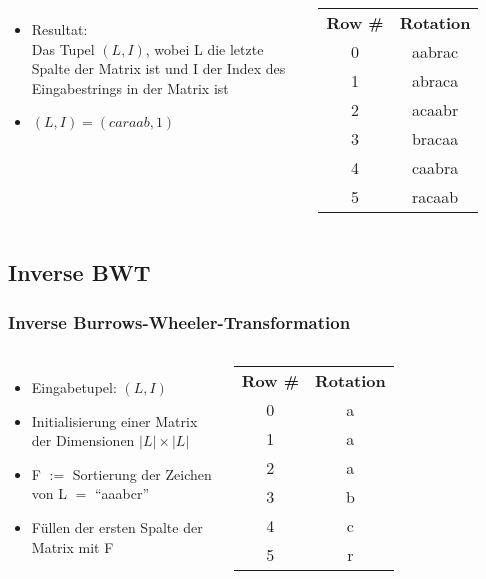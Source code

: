 \documentclass[14pt,xcolor=dvipsnames]{beamer}
\begin{document}
\begin{frame}[allowframebreaks]
\begin{columns}[c,onlytextwidth]
 \begin{itemize}
  \item Resultat:\\
      Das Tupel \textit{$(L,I)$}, wobei L die {\color{red}letzte Spalte} der Matrix ist
      und I der Index des {\color{darkgreen}Eingabestrings in der Matrix} ist
  \item $(L,I) = (caraab, 1)$
 \end{itemize}
    \begin{tabular}{c|c}
    \textbf{Row \#} & \textbf{Rotation} \\
    0 & aabra{\color{red}c} \\
    {\color{darkgreen}1} & {\color{darkgreen}abrac}{\color{red}a} \\
    2 & acaab{\color{red}r} \\
    3 & braca{\color{red}a} \\
    4 & caabr{\color{red}a} \\
    5 & racaa{\color{red}b} \\
    \end{tabular}
\end{columns}
\end{frame}
\subsection{Inverse BWT}
\begin{frame}
\frametitle{Inverse Burrows-Wheeler-Transformation}
\begin{columns}[c,onlytextwidth]
 \begin{itemize}
  \item Eingabetupel: $(L,I)$
  \item Initialisierung einer Matrix der Dimensionen $|L| \times |L|$
  \item F $:=$ Sortierung der Zeichen von L $=$ ``aaabcr''
  \item Füllen der ersten Spalte der Matrix mit {\color{darkgreen}F}
 \end{itemize}
    \begin{tabular}{c|c}
    \textbf{Row \#} & \textbf{Rotation} \\
    0 & {\color{darkgreen}a} \\
    1 & {\color{darkgreen}a} \\
    2 & {\color{darkgreen}a} \\
    3 & {\color{darkgreen}b} \\
    4 & {\color{darkgreen}c} \\
    5 & {\color{darkgreen}r} \\
    \end{tabular}
\end{columns}
\framebreak
\begin{columns}[c,onlytextwidth]
\end{columns}
\end{frame}
\end{document}
